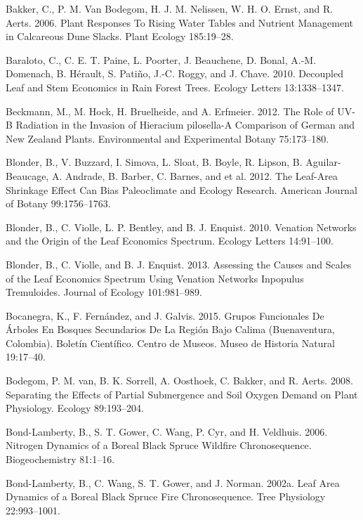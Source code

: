 \documentclass[11pt]{article}
\begin{document}
\begin{hangparas}{1.5em}{1}
\hypertarget{citeproc_bib_item_8}{Bakker, C., P. M. Van Bodegom, H. J. M. Nelissen, W. H. O. Ernst, and R. Aerts. 2006. Plant Responses To Rising Water Tables and Nutrient Management in Calcareous Dune Slacks. Plant Ecology 185:19–28.}

\hypertarget{citeproc_bib_item_9}{Baraloto, C., C. E. T. Paine, L. Poorter, J. Beauchene, D. Bonal, A.-M. Domenach, B. Hérault, S. Patiño, J.-C. Roggy, and J. Chave. 2010. Decoupled Leaf and Stem Economics in Rain Forest Trees. Ecology Letters 13:1338–1347.}

\hypertarget{citeproc_bib_item_10}{Beckmann, M., M. Hock, H. Bruelheide, and A. Erfmeier. 2012. The Role of UV-B Radiation in the Invasion of Hieracium pilosella-A Comparison of German and New Zealand Plants. Environmental and Experimental Botany 75:173–180.}

\hypertarget{citeproc_bib_item_11}{Blonder, B., V. Buzzard, I. Simova, L. Sloat, B. Boyle, R. Lipson, B. Aguilar-Beaucage, A. Andrade, B. Barber, C. Barnes, and et al. 2012. The Leaf-Area Shrinkage Effect Can Bias Paleoclimate and Ecology Research. American Journal of Botany 99:1756–1763.}

\hypertarget{citeproc_bib_item_12}{Blonder, B., C. Violle, L. P. Bentley, and B. J. Enquist. 2010. Venation Networks and the Origin of the Leaf Economics Spectrum. Ecology Letters 14:91–100.}

\hypertarget{citeproc_bib_item_13}{Blonder, B., C. Violle, and B. J. Enquist. 2013. Assessing the Causes and Scales of the Leaf Economics Spectrum Using Venation Networks Inpopulus Tremuloides. Journal of Ecology 101:981–989.}

\hypertarget{citeproc_bib_item_14}{Bocanegra, K., F. Fernández, and J. Galvis. 2015. Grupos Funcionales De Árboles En Bosques Secundarios De La Región Bajo Calima (Buenaventura, Colombia). Boletín Científico. Centro de Museos. Museo de Historia Natural 19:17–40.}

\hypertarget{citeproc_bib_item_15}{Bodegom, P. M. van, B. K. Sorrell, A. Oosthoek, C. Bakker, and R. Aerts. 2008. Separating the Effects of Partial Submergence and Soil Oxygen Demand on Plant Physiology. Ecology 89:193–204.}

\hypertarget{citeproc_bib_item_16}{Bond-Lamberty, B., S. T. Gower, C. Wang, P. Cyr, and H. Veldhuis. 2006. Nitrogen Dynamics of a Boreal Black Spruce Wildfire Chronosequence. Biogeochemistry 81:1–16.}

\hypertarget{citeproc_bib_item_17}{Bond-Lamberty, B., C. Wang, S. T. Gower, and J. Norman. 2002a. Leaf Area Dynamics of a Boreal Black Spruce Fire Chronosequence. Tree Physiology 22:993–1001.}


\end{hangparas}
\end{document}
